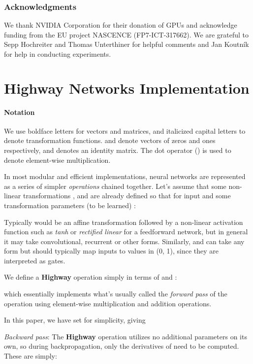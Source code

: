 \documentclass{article}
\begin{document}
\subsubsection*{Acknowledgments}
We thank NVIDIA Corporation for their donation of GPUs and acknowledge funding from the EU project NASCENCE (FP7-ICT-317662). We are grateful to Sepp Hochreiter and Thomas Unterthiner for helpful comments and Jan Koutn\'{i}k for help in conducting experiments.

\small


\appendix
\section{Highway Networks Implementation}\label{sec:impl}

\paragraph{Notation}
We use boldface letters for vectors and matrices, and italicized capital letters to denote transformation functions.  and  denote vectors of zeros and ones respectively, and  denotes an identity matrix. The dot operator () is used to denote element-wise multiplication.

In most modular and efficient implementations, neural networks are represented as a series of simpler \emph{operations} chained together. Let's assume that some non-linear transformations ,  and  are already defined so that for input  and some transformation parameters (to be learned) :



Typically  would be an affine transformation followed by a non-linear activation function such as \emph{tanh} or \emph{rectified linear} for a feedforward network, but in general it may take convolutional, recurrent or other forms. Similarly,  and  can take any form but should typically map inputs to values in (0, 1), since they are interpreted as gates.

We define a \textbf{Highway} operation simply in terms of  and :
 


which essentially implements what's usually called the \emph{forward pass} of the operation using element-wise multiplication and addition operations.

In this paper, we have set  for simplicity, giving



\emph{Backward pass}: The \textbf{Highway} operation utilizes no additional parameters on its own, so during backpropagation, only the derivatives of  need to be computed. These are simply:
\end{document}
